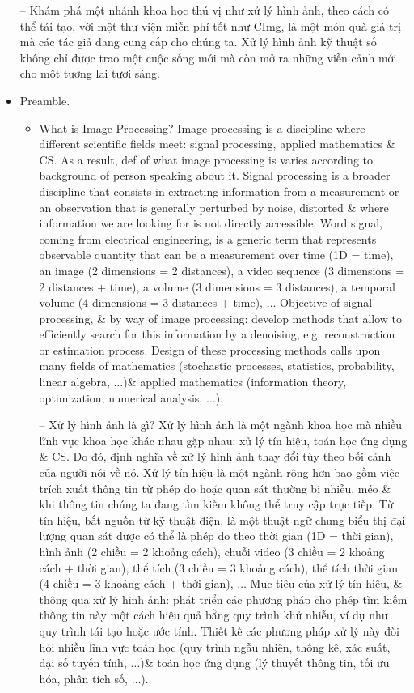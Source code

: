 \documentclass{article}
\begin{document}
\begin{itemize}
    -- Khám phá một nhánh khoa học thú vị như xử lý hình ảnh, theo cách có thể tái tạo, với một thư viện miễn phí tốt như CImg, là một món quà giá trị mà các tác giả đang cung cấp cho chúng ta. Xử lý hình ảnh kỹ thuật số không chỉ được trao một cuộc sống mới mà còn mở ra những viễn cảnh mới cho một tương lai tươi sáng.
    \item {\sf Preamble.}
    \begin{itemize}
        \item {\sf What is Image Processing?} Image processing is a discipline where different scientific fields meet: signal processing, applied mathematics \& CS. As a result, def of what image processing is varies according to background of person speaking about it. Signal processing is a broader discipline that consists in extracting information from a measurement or an observation that is generally perturbed by noise, distorted \& where information we are looking for is not directly accessible. Word signal, coming from electrical engineering, is a generic term that represents observable quantity that can be a measurement over time (1D = time), an image (2 dimensions = 2 distances), a video sequence (3 dimensions = 2 distances $+$ time), a volume (3 dimensions = 3 distances), a temporal volume (4 dimensions = 3 distances + time), $\ldots$ Objective of signal processing, \& by way of image processing: develop methods that allow to efficiently search for this information by a denoising, e.g. reconstruction or estimation process. Design of these processing methods calls upon many fields of mathematics (stochastic processes, statistics, probability, linear algebra, $\ldots$)\& applied mathematics (information theory, optimization, numerical analysis, $\ldots$).
        
        -- {\sf Xử lý hình ảnh là gì?} Xử lý hình ảnh là một ngành khoa học mà nhiều lĩnh vực khoa học khác nhau gặp nhau: xử lý tín hiệu, toán học ứng dụng \& CS. Do đó, định nghĩa về xử lý hình ảnh thay đổi tùy theo bối cảnh của người nói về nó. Xử lý tín hiệu là một ngành rộng hơn bao gồm việc trích xuất thông tin từ phép đo hoặc quan sát thường bị nhiễu, méo \& khi thông tin chúng ta đang tìm kiếm không thể truy cập trực tiếp. Từ tín hiệu, bắt nguồn từ kỹ thuật điện, là một thuật ngữ chung biểu thị đại lượng quan sát được có thể là phép đo theo thời gian (1D = thời gian), hình ảnh (2 chiều = 2 khoảng cách), chuỗi video (3 chiều = 2 khoảng cách $+$ thời gian), thể tích (3 chiều = 3 khoảng cách), thể tích thời gian (4 chiều = 3 khoảng cách + thời gian), $\ldots$ Mục tiêu của xử lý tín hiệu, \& thông qua xử lý hình ảnh: phát triển các phương pháp cho phép tìm kiếm thông tin này một cách hiệu quả bằng quy trình khử nhiễu, ví dụ như quy trình tái tạo hoặc ước tính. Thiết kế các phương pháp xử lý này đòi hỏi nhiều lĩnh vực toán học (quy trình ngẫu nhiên, thống kê, xác suất, đại số tuyến tính, $\ldots$)\& toán học ứng dụng (lý thuyết thông tin, tối ưu hóa, phân tích số, $\ldots$).
        

\end{itemize}
\end{itemize}
\end{document}
